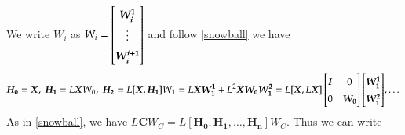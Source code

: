 \documentclass{article}
\newcommand{\colvec}[2][1]{%
	\scalebox{#1}{%
		\renewcommand{\arraystretch}{1.45}%
		$\begin{bmatrix}#2\end{bmatrix}$%
	}
}
\begin{document}
We write $W_i$ as $W_i=\colvec{\bm{W_i^1}\\ \vdots \\ \bm{W_i^{i+1}}}$ and follow \eqref{snowball} we have
\begin{equation*}
 \bm{H_0} = \bm{X}, \; \bm{H_1} = L\bm{X} W_0, \; \bm{H_2} = L[\bm{X}, \bm{H_1} ]W_1 = L\bm{X} \bm{W_1^1} +  L^2 \bm{X}\bm{ W_0 W_1^2} = L [\bm{X}, L\bm{X}]
 \begin{bmatrix}
 \bm{I} & 0\\
 0 & \bm{W_0}
\end{bmatrix} \colvec{ \bm{W_1^1} \\ \bm{W_1^2} }, \dots %
\end{equation*}
As in \eqref{snowball}, we have $L\bm{C}W_C = L[\bm{H_0}, \bm{H_1},\dots, \bm{H_n}] W_C$. Thus we can write
\iffalse
\[\bm{H_3} = L\bm{X} \bm{W_2^1} + L \bm{H_1} \bm{W_2^2} + L \bm{H_2} \bm{W_2^3} =
[\bm{X}, L\bm{X}, L^2 \bm{X}]
\begin{bmatrix}
 \bm{I} & 0 & 0\\
 0 & \bm{I} & 0\\
 0 & 0 & \bm{W_0}
\end{bmatrix}
\begin{bmatrix}
 \bm{I} & 0 & 0\\
 0 & \bm{W_1^2} & 0\\
 0 & 0 & \bm{W_1^1}
\end{bmatrix} \colvec{ \bm{W_2^1} \\ \bm{W_2^2} \\ \bm{W_2^3}}
\]
\fi
\end{document}
